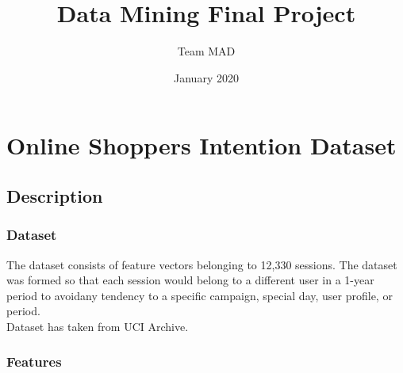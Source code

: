 \documentclass[onecolumn]{article}
\title{Data Mining Final Project}
\author{Team MAD}
\date{January 2020}
\begin{document}
\maketitle

\section{Online Shoppers Intention Dataset}
\subsection{Description}
\subsubsection{Dataset}
The dataset consists of feature vectors belonging to 12,330 sessions. The dataset was formed so that each session would belong to a different user in a 1-year period to avoidany tendency to a specific campaign, special day, user profile, or period.\\

Dataset has taken from UCI Archive.

\subsubsection{Features}
\end{document}
